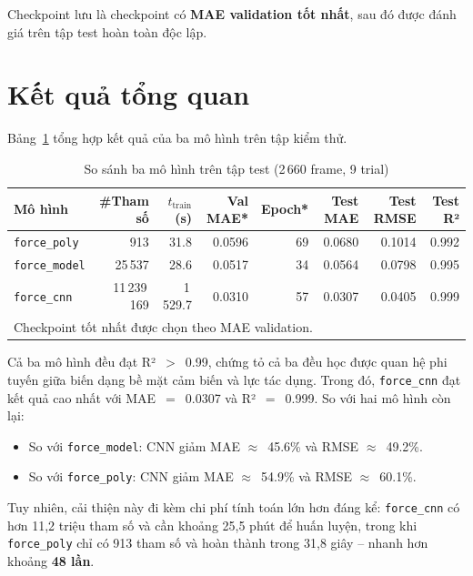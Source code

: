 Checkpoint lưu là checkpoint có \textbf{MAE validation tốt nhất}, sau đó được
đánh giá trên tập test hoàn toàn độc lập.

\section{Kết quả tổng quan}
\label{sec:overall_results}

Bảng~\ref{tab:overall} tổng hợp kết quả của ba mô hình trên tập kiểm thử.

\begin{table}[h]
\centering
\caption{So sánh ba mô hình trên tập test (2\,660 frame, 9 trial)}
\label{tab:overall}
\begin{tabular}{lrrrrrrr}
\toprule
\textbf{Mô hình} & \textbf{\#Tham số} & \textbf{$t_\text{train}$ (s)}
  & \textbf{Val MAE*} & \textbf{Epoch*}
  & \textbf{Test MAE} & \textbf{Test RMSE} & \textbf{Test R²} \\
\midrule
\texttt{force\_poly}  &         913 &    31.8 & 0.0596 &  69 & 0.0680 & 0.1014 & 0.992 \\
\texttt{force\_model} &      25\,537 &    28.6 & 0.0517 &  34 & 0.0564 & 0.0798 & 0.995 \\
\texttt{force\_cnn}   & 11\,239\,169 & 1\,529.7 & 0.0310 &  57 & 0.0307 & 0.0405 & 0.999 \\
\bottomrule
\multicolumn{8}{l}{\footnotesize * Checkpoint tốt nhất được chọn theo MAE validation.}
\end{tabular}
\end{table}

Cả ba mô hình đều đạt R²~$>$~0.99, chứng tỏ cả ba đều học được quan hệ phi
tuyến giữa biến dạng bề mặt cảm biến và lực tác dụng. Trong đó,
\texttt{force\_cnn} đạt kết quả cao nhất với MAE~$=$~0.0307 và
R²~$=$~0.999. So với hai mô hình còn lại:

\begin{itemize}
  \item So với \texttt{force\_model}: CNN giảm MAE $\approx$~45.6\% và
        RMSE $\approx$~49.2\%.
  \item So với \texttt{force\_poly}: CNN giảm MAE $\approx$~54.9\% và
        RMSE $\approx$~60.1\%.
\end{itemize}

Tuy nhiên, cải thiện này đi kèm chi phí tính toán lớn hơn đáng kể:
\texttt{force\_cnn} có hơn 11,2 triệu tham số và cần khoảng 25,5 phút để
huấn luyện, trong khi \texttt{force\_poly} chỉ có 913 tham số và hoàn thành
trong 31,8 giây -- nhanh hơn khoảng \textbf{48 lần}.

